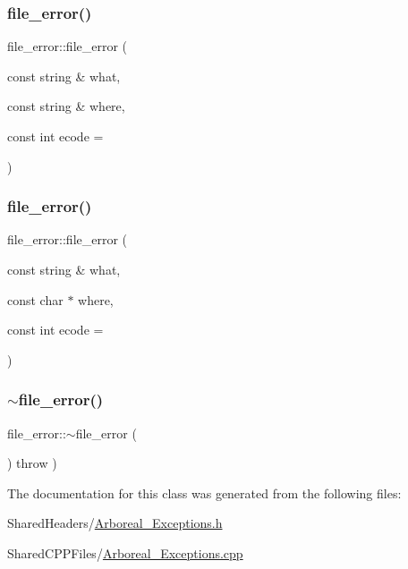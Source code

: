 \subsubsection{\texorpdfstring{file\+\_\+error()}{file\_error()}\hspace{0.1cm}{\footnotesize\ttfamily [3/4]}}
{\footnotesize\ttfamily file\+\_\+error\+::file\+\_\+error (\begin{DoxyParamCaption}\item[{const string \&}]{what,  }\item[{const string \&}]{where,  }\item[{const int}]{ecode = {} }\end{DoxyParamCaption})}

\mbox{\label{classfile__error_a2698ca75c20dd3ffc5adb8d470fff246}} 
\subsubsection{\texorpdfstring{file\+\_\+error()}{file\_error()}\hspace{0.1cm}{\footnotesize\ttfamily [4/4]}}
{\footnotesize\ttfamily file\+\_\+error\+::file\+\_\+error (\begin{DoxyParamCaption}\item[{const string \&}]{what,  }\item[{const char $\ast$}]{where,  }\item[{const int}]{ecode = {} }\end{DoxyParamCaption})}

\mbox{\label{classfile__error_a2f95259fbe2944ce7eb6fddbd700b6de}} 
\subsubsection{\texorpdfstring{$\sim$file\+\_\+error()}{~file\_error()}}
{\footnotesize\ttfamily file\+\_\+error\+::$\sim$file\+\_\+error (\begin{DoxyParamCaption}{ }\end{DoxyParamCaption}) throw  ) }



The documentation for this class was generated from the following files\+:\begin{DoxyCompactItemize}
\item 
Shared\+Headers/\mbox{\hyperlink{_arboreal___exceptions_8h}{Arboreal\+\_\+\+Exceptions.\+h}}\item 
Shared\+C\+P\+P\+Files/\mbox{\hyperlink{_arboreal___exceptions_8cpp}{Arboreal\+\_\+\+Exceptions.\+cpp}}\end{DoxyCompactItemize}
